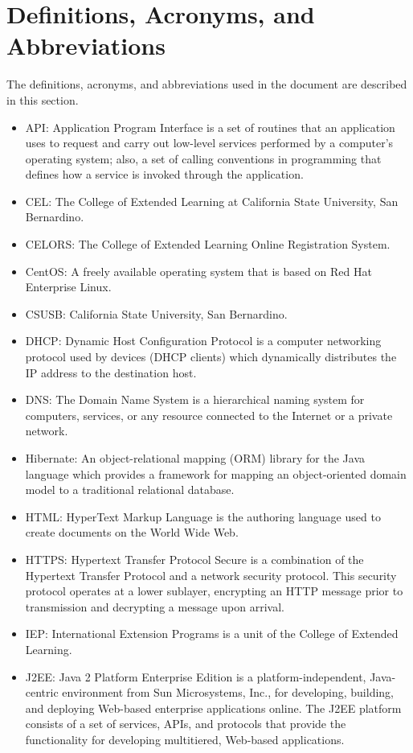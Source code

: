 \section{Definitions, Acronyms, and Abbreviations}

The definitions, acronyms, and abbreviations used in the document are described in this section.

\begin{itemize}
    \item API: Application Program Interface is a set of routines that an application uses to request and carry out low-level services performed by a computer's operating system; also, a set of calling conventions in programming that defines how a service is invoked through the application.
    \item CEL: The College of Extended Learning at California State University, San Bernardino.
    \item CELORS: The College of Extended Learning Online Registration System.
    \item CentOS: A freely available operating system that is based on Red Hat Enterprise Linux.
    \item CSUSB: California State University, San Bernardino.
    \item DHCP: Dynamic Host Configuration Protocol is a computer networking protocol used by devices (DHCP clients) which dynamically distributes the IP address to the destination host.
    \item DNS: The Domain Name System is a hierarchical naming system for computers, services, or any resource connected to the Internet or a private network.
    \item Hibernate\label{def:hibernate}: An object-relational mapping (ORM) library for the Java language which provides a framework for mapping an object-oriented domain model to a traditional relational database.
    \item HTML: HyperText Markup Language is the authoring language used to create documents on the World Wide Web.
    \item HTTPS: Hypertext Transfer Protocol Secure is a combination of the Hypertext Transfer Protocol and a network security protocol. This security protocol operates at a lower sublayer, encrypting an HTTP message prior to transmission and decrypting a message upon arrival.
    \item IEP: International Extension Programs is a unit of the College of Extended Learning.
    \item J2EE: Java 2 Platform Enterprise Edition is a platform-independent, Java-centric environment from Sun Microsystems, Inc., for developing, building, and deploying Web-based enterprise applications online. The J2EE platform consists of a set of services, APIs, and protocols that provide the functionality for developing multitiered, Web-based applications.

\end{itemize}
